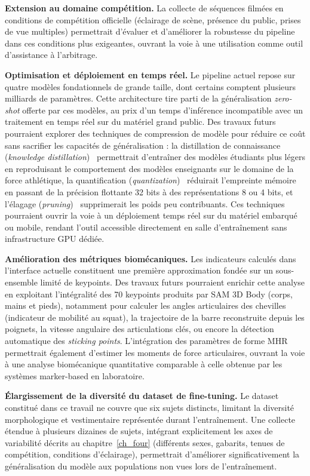 \textbf{Extension au domaine compétition.} La collecte de séquences filmées en conditions de compétition officielle (éclairage de scène, présence du public, prises de vue multiples) permettrait d'évaluer et d'améliorer la robustesse du pipeline dans ces conditions plus exigeantes, ouvrant la voie à une utilisation comme outil d'assistance à l'arbitrage.

\textbf{Optimisation et déploiement en temps réel.} Le pipeline actuel repose sur quatre modèles fondationnels de grande taille, dont certains comptent plusieurs milliards de paramètres. Cette architecture tire parti de la généralisation \textit{zero-shot} offerte par ces modèles, au prix d'un temps d'inférence incompatible avec un traitement en temps réel sur du matériel grand public. Des travaux futurs pourraient explorer des techniques de compression de modèle pour réduire ce coût sans sacrifier les capacités de généralisation : la distillation de connaissance (\emph{knowledge distillation})~\cite{Distilling-2015} permettrait d'entraîner des modèles étudiants plus légers en reproduisant le comportement des modèles enseignants sur le domaine de la force athlétique, la quantification (\emph{quantization})~\cite{Quantification-2021} réduirait l'empreinte mémoire en passant de la précision flottante 32 bits à des représentations 8 ou 4 bits, et l'élagage (\emph{pruning})~\cite{Brain-Damage-1989} supprimerait les poids peu contribuants. Ces techniques pourraient ouvrir la voie à un déploiement temps réel sur du matériel embarqué ou mobile, rendant l'outil accessible directement en salle d'entraînement sans infrastructure GPU dédiée.

\textbf{Amélioration des métriques biomécaniques.} Les indicateurs calculés dans l'interface actuelle constituent une première approximation fondée sur un sous-ensemble limité de keypoints. Des travaux futurs pourraient enrichir cette analyse en exploitant l'intégralité des 70 keypoints produits par SAM 3D Body (corps, mains et pieds), notamment pour calculer les angles articulaires des chevilles (indicateur de mobilité au squat), la trajectoire de la barre reconstruite depuis les poignets, la vitesse angulaire des articulations clés, ou encore la détection automatique des \emph{sticking points}. L'intégration des paramètres de forme MHR permettrait également d'estimer les moments de force articulaires, ouvrant la voie à une analyse biomécanique quantitative comparable à celle obtenue par les systèmes marker-based en laboratoire.

\textbf{Élargissement de la diversité du dataset de fine-tuning.} Le dataset constitué dans ce travail ne couvre que six sujets distincts, limitant la diversité morphologique et vestimentaire représentée durant l'entraînement. Une collecte étendue à plusieurs dizaines de sujets, intégrant explicitement les axes de variabilité décrits au chapitre~\ref{ch_four} (différents sexes, gabarits, tenues de compétition, conditions d'éclairage), permettrait d'améliorer significativement la généralisation du modèle aux populations non vues lors de l'entraînement.

